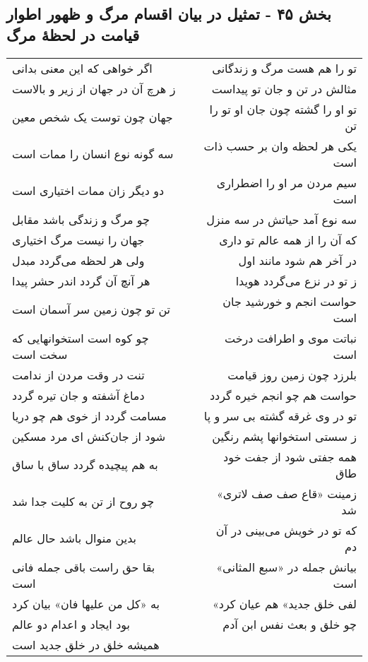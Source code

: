 \begin{center}
\section*{بخش ۴۵ - تمثیل در بیان اقسام مرگ و ظهور اطوار قیامت در لحظهٔ مرگ}
\label{sec:sh045}
\begin{longtable}{l p{0.5cm} r}
اگر خواهی که این معنی بدانی
&&
تو را هم هست مرگ و زندگانی
\\
ز هرچ آن در جهان از زیر و بالاست
&&
مثالش در تن و جان تو پیداست
\\
جهان چون توست یک شخص معین
&&
تو او را گشته چون جان او تو را تن
\\
سه گونه نوع انسان را ممات است
&&
یکی هر لحظه وان بر حسب ذات است
\\
دو دیگر زان ممات اختیاری است
&&
سیم مردن مر او را اضطراری است
\\
چو مرگ و زندگی باشد مقابل
&&
سه نوع آمد حیاتش در سه منزل
\\
جهان را نیست مرگ اختیاری
&&
که آن را از همه عالم تو داری
\\
ولی هر لحظه می‌گردد مبدل
&&
در آخر هم شود مانند اول
\\
هر آنچ آن گردد اندر حشر پیدا
&&
ز تو در نزع می‌گردد هویدا
\\
تن تو چون زمین سر آسمان است
&&
حواست انجم و خورشید جان است
\\
چو کوه است استخوانهایی که سخت است
&&
نباتت موی و اطرافت درخت است
\\
تنت در وقت مردن از ندامت
&&
بلرزد چون زمین روز قیامت
\\
دماغ آشفته و جان تیره گردد
&&
حواست هم چو انجم خیره گردد
\\
مسامت گردد از خوی هم چو دریا
&&
تو در وی غرقه گشته بی سر و پا
\\
شود از جان‌کنش ای مرد مسکین
&&
ز سستی استخوانها پشم رنگین
\\
به هم پیچیده گردد ساق با ساق
&&
همه جفتی شود از جفت خود طاق
\\
چو روح از تن به کلیت جدا شد
&&
زمینت «قاع صف صف لاتری» شد
\\
بدین منوال باشد حال عالم
&&
که تو در خویش می‌بینی در آن دم
\\
بقا حق راست باقی جمله فانی است
&&
بیانش جمله در «سبع المثانی» است
\\
به «کل من علیها فان» بیان کرد
&&
«لفی خلق جدید» هم عیان کرد
\\
بود ایجاد و اعدام دو عالم
&&
چو خلق و بعث نفس ابن آدم
\\
همیشه خلق در خلق جدید است

\end{longtable}
\end{center}
